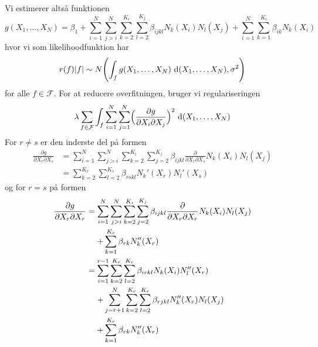 \documentclass[a4paper, 12pt]{memoir}
\begin{document}
Vi estimerer altså funktionen
\begin{equation*}
g(X_1, \dots, X_N)=\beta_1+\sum_{i=1}^N\sum_{j>i}^N \sum_{k=2}^{K_i}\sum_{l=2}^{K_j} \beta_{ijkl}N_k(X_i)N_l(X_j)+\sum_{i=1}^N\sum_{k=1}^{K_i}\beta_{ik}N_k(X_i)
\end{equation*}
hvor vi som likelihoodfunktion har
\begin{equation*}
r(f)|f| \sim N\Biggl(\int_f g(X_1, \dots, X_N) \textup{ d}(X_1, \dots, X_N), \sigma^2\Biggr)
\end{equation*}
for alle $f\in\mathcal F$. For at reducere overfitningen, bruger vi regulariseringen
\begin{equation}
\lambda \sum_{f\in\mathcal F} \int_f \sum_{i=1}^N \sum_{j=1}^N \Bigl(\frac{\partial g}{\partial X_i\partial X_j}\Bigr)^2  \textup{ d}(X_1, \dots, X_N)\label{regul}
\end{equation}
For $r\neq s$ er den inderste del på formen
\begin{align*}
\frac{\partial g}{\partial X_r\partial X_s} &= \sum_{i=1}^N\sum_{j>i}^N \sum_{k=2}^{K_i}\sum_{j=2}^{K_j} \beta_{ijkl}\frac{\partial }{\partial X_r\partial X_s} N_k(X_i)N_l(X_j)\\
&=\sum_{k=2}^{K_r}\sum_{l=2}^{K_s} \beta_{rskl}N_k'(X_r)N_l'(X_s)
\end{align*}
og for $r= s$ på formen
\begin{align}
\frac{\partial g}{\partial X_r\partial X_r} &= \begin{lgathered}[t]\sum_{i=1}^N\sum_{j>i}^N \sum_{k=2}^{K_i}\sum_{j=2}^{K_j} \beta_{ijkl}\frac{\partial }{\partial X_r\partial X_r} N_k(X_i)N_l(X_j)\\
+\sum_{k=1}^{K_r}\beta_{rk}N_k''(X_r)
\end{lgathered}\\
&=\begin{lgathered}[t] \sum_{i=1}^{r-1} \sum_{k=2}^{K_r}\sum_{l=2}^{K_r} \beta_{irkl} N_k(X_i)N_l''(X_r)\\
+\sum_{j=r+1}^N \sum_{k=2}^{K_r}\sum_{l=2}^{K_r} \beta_{rjkl} N_k''(X_r)N_l(X_j)\\
+\sum_{k=1}^{K_r}\beta_{rk}N_k''(X_r)
\end{lgathered}
\end{align}
%
\end{document}
